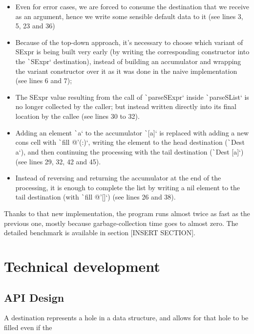\documentclass[english]{jflart}
\begin{document}
\begin{itemize}
  \item Even for error cases, we are forced to consume the destination that we receive as an argument, hence we write some sensible default data to it (see lines 3, 5, 23 and 36)
  \item Because of the top-down approach, it's necessary to choose which variant of SExpr is being built very early (by writing the corresponding constructor into the \texttt`SExpr` destination), instead of building an accumulator and wrapping the variant constructor over it as it was done in the naive implementation (see lines 6 and 7);
  \item The SExpr value resulting from the call of \texttt`parseSExpr` inside \texttt`parseSList` is no longer collected by the caller; but instead written directly into its final location by the callee (see lines 30 to 32).
  \item Adding an element \texttt`a` to the accumulator \texttt`[a]` is replaced with adding a new cons cell with \texttt`fill @'(:)`, writing the element to the head destination (\texttt`Dest a`), and then continuing the processing with the tail destination (\texttt`Dest [a]`) (see lines 29, 32, 42 and 45).
  \item Instead of reversing and returning the accumulator at the end of the processing, it is enough to complete the list by writing a nil element to the tail destination (with \texttt`fill @'[]`) (see lines 26 and 38).
\end{itemize}

Thanks to that new implementation, the program runs almost twice as fast as the previous one, mostly because garbage-collection time goes to almost zero. The detailed benchmark is available in section [INSERT SECTION].

\section{Technical development}\label{sec:api}

\subsection{API Design}

A destination represents a hole in a data structure, and allows for that hole to be filled even if the 
\end{document}
